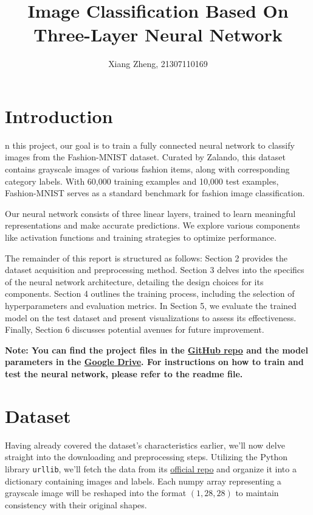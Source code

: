 \documentclass[10pt,a4paper,twoside]{tau}
\title{Image Classification Based On Three-Layer Neural Network}
\author[]{Xiang Zheng, 21307110169}
\affil[]{School of Data Science, Fudan University}
\date{}
\begin{document}
		
\maketitle
\thispagestyle{firststyle}
\tauabstract


\section{Introduction}

n this project, our goal is to train a fully connected neural network to classify images from the Fashion-MNIST dataset. Curated by Zalando, this dataset contains grayscale images of various fashion items, along with corresponding category labels. With 60,000 training examples and 10,000 test examples, Fashion-MNIST serves as a standard benchmark for fashion image classification.

Our neural network consists of three linear layers, trained to learn meaningful representations and make accurate predictions. We explore various components like activation functions and training strategies to optimize performance. 

The remainder of this report is structured as follows: Section 2 provides the dataset acquisition and preprocessing method. Section 3 delves into the specifics of the neural network architecture, detailing the design choices for its components. Section 4 outlines the training process, including the selection of hyperparameters and evaluation metrics. In Section 5, we evaluate the trained model on the test dataset and present visualizations to assess its effectiveness. Finally, Section 6 discusses potential avenues for future improvement. 

\textbf{Note: You can find the project files in the \href{https://github.com/mango7789/Computer-Vision-HW1}{GitHub repo} and the model parameters in the \href{https://drive.google.com/file/d/1fHbpA-FtWAH-j2v-awv-D9p3sIjMfqLW/view?usp=drive_link}{Google Drive}. For instructions on how to train and test the neural network, please refer to the readme file.}



\section{Dataset}

Having already covered the dataset's characteristics earlier, we'll now delve straight into the downloading and preprocessing steps. Utilizing the Python library \texttt{urllib}, we'll fetch the data from its \href{https://github.com/zalandoresearch/fashion-mnist}{official repo} and organize it into a dictionary containing images and labels. Each numpy array representing a grayscale image will be reshaped into the format $(1, 28, 28)$ to maintain consistency with their original shapes.
\end{document}
